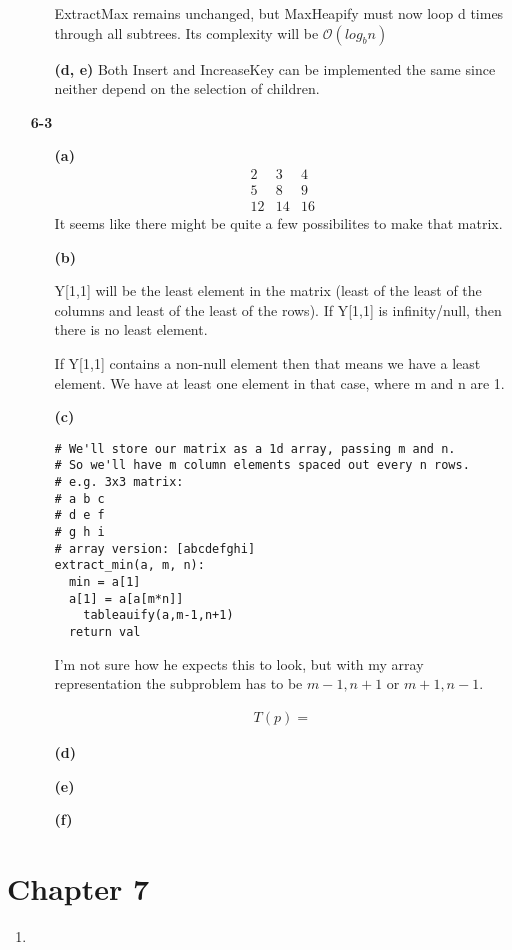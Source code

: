 \documentclass{article}
\begin{document}
\begin{enumerate}
\begin{enumerate}
	ExtractMax remains unchanged, but MaxHeapify must now loop d times through
	all subtrees. Its complexity will be $\mathcal{O}(log_bn)$

	\item[\textbf{(d, e)}]
	Both Insert and IncreaseKey can be implemented the same since neither depend
	on the selection of children.

	\end{enumerate}

\item[\textbf{6-3}]

	\begin{enumerate}
	\item[\textbf{(a)}]
	\[ \begin{matrix}
	2 & 3 & 4 \\
	5 & 8 & 9 \\
	12 & 14 & 16 
	\end{matrix} \]
	It seems like there might be quite a few possibilites to make that matrix.

	\item[\textbf{(b)}]

	Y[1,1] will be the least element in the matrix (least of the least of the
	columns and least of the least of the rows). If Y[1,1] is infinity/null, then
	there is no least element.

	If Y[1,1] contains a non-null element then that means we have a least
	element. We have at least one element in that case, where m and n are 1.

	\item[\textbf{(c)}]

\begin{verbatim}
# We'll store our matrix as a 1d array, passing m and n.
# So we'll have m column elements spaced out every n rows.
# e.g. 3x3 matrix:
# a b c
# d e f
# g h i
# array version: [abcdefghi]
extract_min(a, m, n):
  min = a[1]
  a[1] = a[a[m*n]]
	tableauify(a,m-1,n+1)
  return val
\end{verbatim}

I'm not sure how he expects this to look, but with my array representation the
subproblem has to be $m-1, n+1$ or $m+1, n-1$. 

\begin{align*}
T(p) = 
\end{align*}

	\item[\textbf{(d)}]

	\item[\textbf{(e)}]

	\item[\textbf{(f)}]

	\end{enumerate}

\end{enumerate}

\section*{Chapter 7}

\begin{enumerate}

\item

\end{enumerate}
\end{document}
